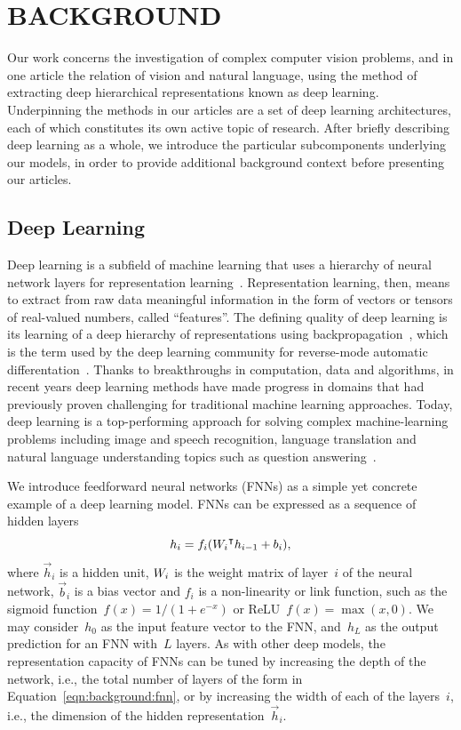 \chapter{BACKGROUND}

Our work concerns the investigation of complex computer vision problems, and in
one article the relation of vision and natural language, using the method of
extracting deep hierarchical representations known as deep learning.
Underpinning the methods in our articles are a set of deep learning
architectures, each of which constitutes its own active topic of research.
After briefly describing deep learning as a whole, we introduce the particular
subcomponents underlying our models, in order to provide additional background
context before presenting our articles.


\section{Deep Learning}

Deep learning is a subfield of machine learning that uses a hierarchy of neural
network layers for representation learning~\cite{lecun2015deeplearning}.
Representation learning, then, means to extract from raw data meaningful
information in the form of vectors or tensors of real-valued numbers, called
``features''.
The defining quality of deep learning is its learning of a deep hierarchy of
representations using backpropagation~\cite{rumelhart1988learningreps}, which
is the term used by the deep learning community for reverse-mode automatic
differentation~\cite{griewank2008evaluatingderivatives}.
Thanks to breakthroughs in computation, data and algorithms, in recent years
deep learning methods have made progress in domains that had previously proven
challenging for traditional machine learning approaches.
Today, deep learning is a top-performing approach for solving complex
machine-learning problems including image and speech recognition, language
translation and natural language understanding topics such as question
answering~\cite{lecun2015deeplearning}.

We introduce feedforward neural networks (FNNs) as a simple yet concrete
example of a deep learning model.
FNNs can be expressed as a sequence of hidden layers
\begin{equation}
h_i = f_i({W_i}^\intercal h_{i - 1} + b_i),
\label{eqn:background:fnn}
\end{equation}
where $\vec{h}_i$ is a hidden unit, $W_i$ is the weight matrix of
layer~$i$ of the neural network, $\vec{b}_i$ is a bias vector and $f_i$ is a
non-linearity or link function, such as the sigmoid
function~$f(x) = 1/(1 + e^{-x})$ or ReLU~$f(x) = \max(x, 0)$.
We may consider~$h_0$ as the input feature vector to the FNN, and~$h_L$ as the
output prediction for an FNN with~$L$ layers.
As with other deep models, the representation capacity of FNNs can be tuned by
increasing the depth of the network, i.e., the total number of layers of the
form in Equation~\ref{eqn:background:fnn}, or by increasing the width of each
of the layers~$i$, i.e., the dimension of the hidden
representation~$\vec{h}_i$.


